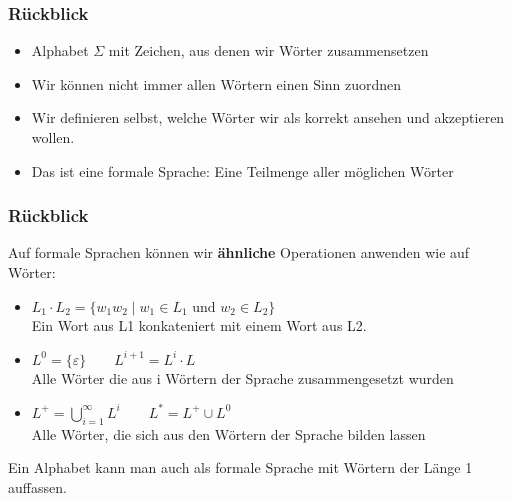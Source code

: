 \framePrevEpisode

\begin{frame}
	\frametitle{Rückblick}
	\begin{itemize}
		\item Alphabet $\Sigma$ mit Zeichen, aus denen wir Wörter zusammensetzen
		\item Wir können nicht immer allen Wörtern einen Sinn zuordnen 
		\item Wir definieren selbst, welche Wörter wir als korrekt ansehen und akzeptieren wollen.
		\item Das ist eine formale Sprache: Eine Teilmenge aller möglichen Wörter
	\end{itemize}
\end{frame}

\begin{frame}
	\frametitle{Rückblick}
	Auf formale Sprachen können wir \textbf{ähnliche} Operationen anwenden wie auf Wörter:
	\begin{itemize}
		\item $L_1 \cdot L_2 = \{w_1 w_2 \mid w_1 \in L_1 \text{ und } w_2 \in L_2 \}$\\
		Ein Wort aus L1 konkateniert mit einem Wort aus L2.
		\pause
		\item $L^0 = \{\varepsilon \} \qquad L^{i+1} = L^i \cdot L$\\
		Alle Wörter die aus i Wörtern der Sprache zusammengesetzt wurden
		\pause
		\item $L^+ = \bigcup \limits_{i=1}^\infty L^i \qquad L^* = L^+ \cup L^0$\\
		Alle Wörter, die sich aus den Wörtern der Sprache bilden lassen
	\end{itemize}
	Ein Alphabet kann man auch als formale Sprache mit Wörtern der Länge 1 auffassen.
\end{frame}

\begin{frame}
	\begin{itemize}
		\TrueQuestionE{$\{\}^* \neq \{\} $}{ $\quad \{\}^* = \{\varepsilon\}$}
	\end{itemize}	
\end{frame}

